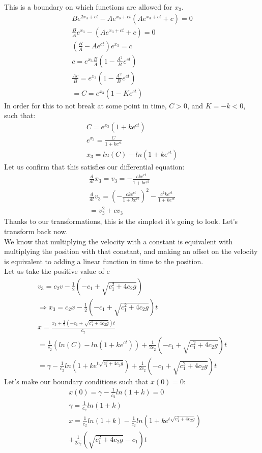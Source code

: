 \documentclass[english,a4paper,oneside,article,9pt]{memoir}
\begin{document}
This is a boundary on which functions are allowed for $x_3$.
\begin{align*}
Be^{2x_3+ct}-Ae^{x_3+ct}(Ae^{x_3+ct}+c)=0\\
\frac{B}{A}e^{x_3}-(Ae^{x_3+ct}+c)=0\\
(\frac{B}{A}-Ae^{ct})e^{x_3}=c\\
c=e^{x_3}\frac{B}{A}(1-\frac{A^2}{B}e^{ct})\\
\frac{Ac}{B}=e^{x_3}(1-\frac{A^2}{B}e^{ct})\\
=C=e^{x_3}(1-Ke^{ct})
\end{align*}
In order for this to not break at some point in time, $C>0$, and $K=-k<0$, such that:
\begin{align*}
C=e^{x_3}(1+ke^{ct})\\
e^{x_3}=\frac{C}{1+ke^{ct}}\\
x_3=ln(C)-ln(1+ke^{ct})
\end{align*}
Let us confirm that this satisfies our differential equation:
\begin{align*}
\frac{d}{dt}x_3=v_3=-\frac{cke^{ct}}{1+ke^{ct}}\\
\frac{d}{dt} v_3=(-\frac{cke^{ct}}{1+ke^{ct}})^2-\frac{c^2ke^{ct}}{1+ke^{ct}}\\
=v_3^2+cv_3
\end{align*}
Thanks to our transformations, this is the simplest it's going to look. Let's transform back now.\\
We know that multiplying the velocity with a constant is equivalent with multiplying the position with that constant, and making an offset on the velocity is equivalent to adding a linear function in time to the position.\\
Let us take the positive value of c\\
\begin{align*}
v_3=c_2v-\frac{1}{2}(-c_1+\sqrt{c_1^2+4c_2g})\\
\Rightarrow x_3=c_2x-\frac{1}{2}(-c_1+\sqrt{c_1^2+4c_2g})t\\
x=\frac{x_3+\frac{1}{2}(-c_1+\sqrt{c_1^2+4c_2g})t}{c_2}\\
=\frac{1}{c_2}(ln(C)-ln(1+ke^{ct}))+\frac{1}{2c_2}(-c_1+\sqrt{c_1^2+4c_2g})t\\
=\gamma-\frac{1}{c_2}ln(1+ke^{t\sqrt{c_1^2+4c_2g}})+\frac{1}{2c_2}(-c_1+\sqrt{c_1^2+4c_2g})t
\end{align*}
Let's make our boundary conditions such that $x(0)=0$:
\begin{align*}
&x(0)=\gamma-\frac{1}{c_2}ln(1+k)=0\\
&\gamma=\frac{1}{c_2}ln(1+k)\\
&x=\frac{1}{c_2}ln(1+k)-\frac{1}{c_2}ln(1+ke^{t\sqrt{c_1^2+4c_2g}})\\
&+\frac{1}{2c_2}(\sqrt{c_1^2+4c_2g}-c_1)t
\end{align*}
\end{document}

